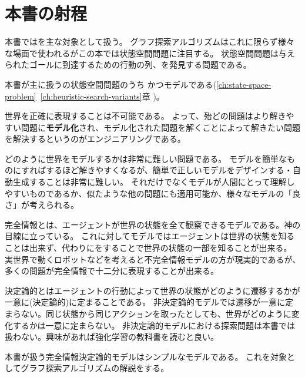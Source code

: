\section{本書の射程}
\label{sec:coverage}

本書ではを主な対象として扱う。
グラフ探索アルゴリズムはこれに限らず様々な場面で使われるがこの本では状態空間問題に注目する。
状態空間問題は与えられたゴールに到達するための行動の列、を発見する問題である。

本書が主に扱うの状態空間問題のうち
かつモデルである(\ref{ch:state-space-problem}~\ref{ch:heuristic-search-variants}章
)。

世界を正確に表現することは不可能である。
よって、殆どの問題はより解きやすい問題に{\bf モデル化}され、モデル化された問題を解くことによって解きたい問題を解決するというのがエンジニアリングである。

どのように世界をモデルするかは非常に難しい問題である。
モデルを簡単なものにすればするほど解きやすくなるが、簡単で正しいモデルをデザインする・自動生成することは非常に難しい。
それだけでなくモデルが人間にとって理解しやすいものであるか、似たような他の問題にも適用可能か、様々なモデルの「良さ」が考えられる。

完全情報とは、エージェントが世界の状態を全て観察できるモデルである。神の目線に立っている。
これに対してモデルではエージェントは世界の状態を知ることは出来ず、代わりにをすることで世界の状態の一部を知ることが出来る。
実世界で動くロボットなどを考えると不完全情報モデルの方が現実的であるが、多くの問題が完全情報で十二分に表現することが出来る。

決定論的とはエージェントの行動によって世界の状態がどのように遷移するかが一意に(決定論的)に定まることである。
非決定論的モデルでは遷移が一意に定まらない。同じ状態から同じアクションを取ったとしても、世界がどのように変化するかは一意に定まらない。
非決定論的モデルにおける探索問題は本書では扱わない。興味があれば強化学習の教科書を読むと良い\cite{sutton1998introduction}。


本書が扱う完全情報決定論的モデルはシンプルなモデルである。
これを対象としてグラフ探索アルゴリズムの解説をする。



